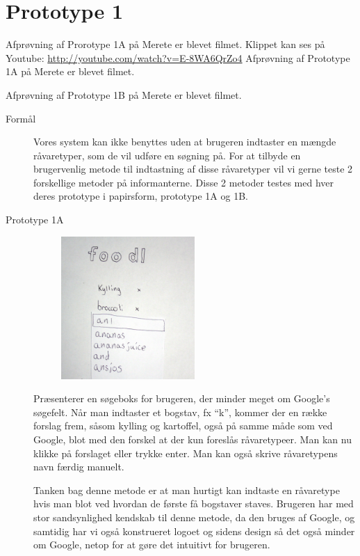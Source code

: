 \section{Prototype 1}
\label{ap:prototype1}

Afprøvning af Prorotype 1A på Merete er blevet filmet. Klippet kan ses på Youtube: \url{http://youtube.com/watch?v=E-8WA6QrZo4}
Afprøvning af Prototype 1A på Merete er blevet filmet\cite{prototype1amerete}.

Afprøvning af Prototype 1B på Merete er blevet filmet\cite{prototype1bmerete}.

\begin{description}
\item[Formål] Vores system kan ikke benyttes uden at brugeren indtaster en mængde råvaretyper, som de vil udføre en søgning på. For at tilbyde en brugervenlig metode til indtastning af disse råvaretyper vil vi gerne teste 2 forskellige metoder på informanterne. Disse 2 metoder testes med hver deres prototype i papirsform, prototype 1A og 1B.
\item[Prototype 1A]
\begin{figure}[H]
\centering
\includegraphics[width=0.5\textwidth]{billeder/prototyper/prototype1a.jpg}
\label{fig:prototype1a}
\end{figure}

Præsenterer en søgeboks for brugeren, der minder meget om Google’s søgefelt. Når man indtaster et bogstav, fx “k”, kommer der en række forslag frem, såsom kylling og kartoffel, også på samme måde som ved Google, blot med den forskel at der kun foreslås råvaretypeer. Man kan nu klikke på forslaget eller trykke enter. Man kan også skrive råvaretypens navn færdig manuelt.

Tanken bag denne metode er at man hurtigt kan indtaste en råvaretype hvis man blot ved hvordan de første få bogstaver staves. Brugeren har med stor sandsynlighed kendskab til denne metode, da den bruges af Google, og samtidig har vi også konstrueret logoet og sidens design så det også minder om Google, netop for at gøre det intuitivt for brugeren.


\end{description}

